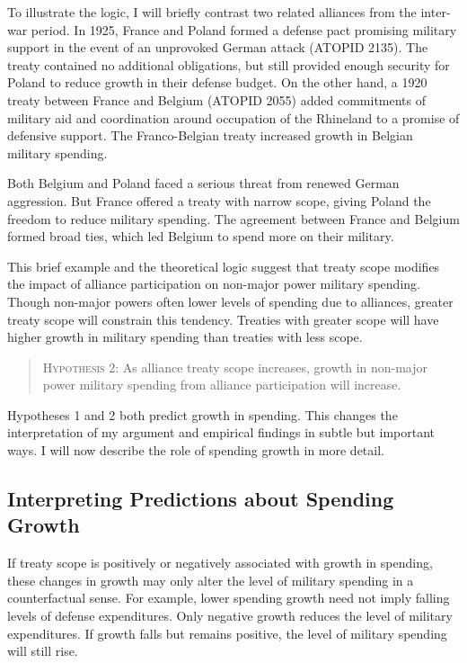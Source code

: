 \documentclass[12pt]{article}
\begin{document}
To illustrate the logic, I will briefly contrast two related alliances from the inter-war period. 
In 1925, France and Poland formed a defense pact promising military support in the event of an unprovoked German attack (ATOPID 2135). 
The treaty contained no additional obligations, but still provided enough security for Poland to reduce growth in their defense budget.
On the other hand, a 1920 treaty between France and Belgium (ATOPID 2055) added commitments of military aid and coordination around occupation of the Rhineland to a promise of defensive support. 
The Franco-Belgian treaty increased growth in Belgian military spending. 


Both Belgium and Poland faced a serious threat from renewed German aggression. 
But France offered a treaty with narrow scope, giving Poland the freedom to reduce military spending. 
The agreement between France and Belgium formed broad ties, which led Belgium to spend more on their military. 


This brief example and the theoretical logic suggest that treaty scope modifies the impact of alliance participation on non-major power military spending. 
Though non-major powers often lower levels of spending due to alliances, greater treaty scope will constrain this tendency. 
Treaties with greater scope will have higher growth in military spending than treaties with less scope. 


\begin{quote}
\textsc{Hypothesis 2}: As alliance treaty scope increases, growth in non-major power military spending from alliance participation will increase. 
\end{quote}


Hypotheses 1 and 2 both predict growth in spending. 
This changes the interpretation of my argument and empirical findings in subtle but important ways. 
I will now describe the role of spending growth in more detail. 


\subsection{Interpreting Predictions about Spending Growth}


If treaty scope is positively or negatively associated with growth in spending, these changes in growth may only alter the level of military spending in a counterfactual sense. 
For example, lower spending growth need not imply falling levels of defense expenditures. 
Only negative growth reduces the level of military expenditures. 
If growth falls but remains positive, the level of military spending will still rise. 
\end{document}
